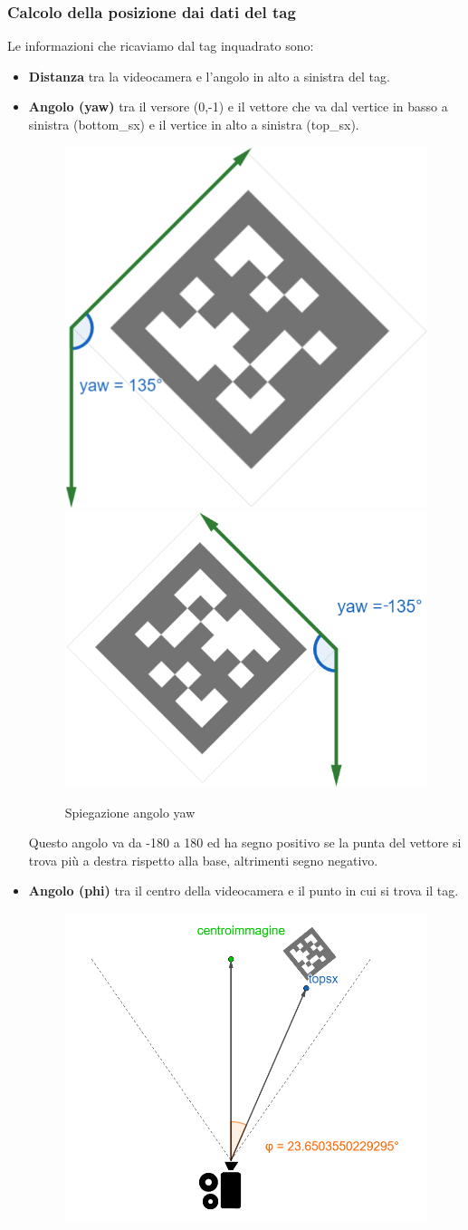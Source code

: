 \documentclass[]{article}
\begin{document}
\subsubsection{Calcolo della posizione dai dati del tag}
Le informazioni che ricaviamo dal tag inquadrato sono:
\begin{itemize}
    \item \textbf{Distanza} tra la videocamera e l'angolo in alto a sinistra del tag.
    \item \textbf{Angolo (yaw)} tra il versore (0,-1) e il vettore che va dal vertice in basso a sinistra (bottom\_sx) e il vertice in alto a sinistra (top\_sx).
          \begin{figure}[H]
              \centering
              \includegraphics[height=0.3\linewidth]{immagini/yaw.png}
              \includegraphics[height=0.3\linewidth]{immagini/spiegazione_yaw_negativo.png}
              \caption{Spiegazione angolo yaw}
          \end{figure}
          Questo angolo va da -180 a 180 ed ha segno positivo se la punta del vettore si trova più a destra rispetto alla base, altrimenti segno negativo.
    \item \textbf{Angolo (phi)} tra il centro della videocamera e il punto in cui si trova il tag.
          \begin{figure}[H]
              \centering
              \includegraphics[height=0.3\linewidth]{immagini/phi_positivo.png}

\end{figure}
\end{itemize}
\end{document}
